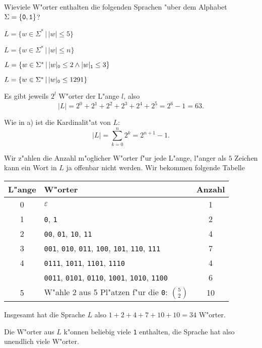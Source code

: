 Wieviele W"orter enthalten die folgenden Sprachen "uber dem Alphabet 
$\Sigma=\{{\tt 0}, {\tt 1}\}$?
\begin{teilaufgaben}
\item $L=\{ w\in\Sigma^*\,|\, |w|\le 5\}$
\item $L=\{ w\in\Sigma^*\,|\, |w|\le n\}$
\item $L=\{ w\in\Sigma^*\,|\,
|w|_{\tt 0}\le 2
\wedge
|w|_{\tt 1}\le 3
\}$
\item $L=\{ w\in\Sigma^*\,|\, |w|_{\tt 0}\le 1291\}$
\end{teilaufgaben}

\begin{loesung}
\begin{teilaufgaben}
\item
Es gibt jeweils $2^l$ W"orter der L"ange $l$, also
\[
|L|=2^0 + 2^1+2^2+2^3+2^4+2^5=2^6-1=63.
\]
\item
Wie in a) ist die Kardinalit"at von $L$:
\[
|L|=\sum_{k=0}^n2^k=2^{n+1}-1.
\]
\item
Wir z"ahlen die Anzahl m"oglicher W"orter f"ur jede L"ange, l"anger als
$5$ Zeichen kann ein Wort in $L$ ja offenbar nicht werden. Wir bekommen
folgende Tabelle
\begin{center}
\begin{tabular}{|c|l|c|}
\hline
L"ange&W"orter&Anzahl\\
\hline
0&$\varepsilon$&1\\
1&{\tt 0}, {\tt 1}&2\\
2&{\tt 00}, {\tt 01}, {\tt 10}, {\tt 11}&4\\
3&{\tt 001}, {\tt 010}, {\tt 011}, {\tt 100}, {\tt 101}, {\tt 110}, {\tt 111}&7\\
4&{\tt 0111}, {\tt 1011}, {\tt 1101}, {\tt 1110}&4\\
 &{\tt 0011}, {\tt 0101}, {\tt 0110}, {\tt 1001}, {\tt 1010}, {\tt 1100}&6\\
5&W"ahle 2 aus 5 Pl"atzen f"ur die {\tt 0}: $\binom{5}{2}$&10\\
\hline
\end{tabular}
\end{center}
Insgesamt hat die Sprache $L$ also $1+2+4+7+10+10=34$ W"orter.
\item Die W"orter aus $L$ k"onnen beliebig viele {\tt 1} enthalten,
die Sprache hat also unendlich viele W"orter.
\qedhere
\end{teilaufgaben}
\end{loesung}
